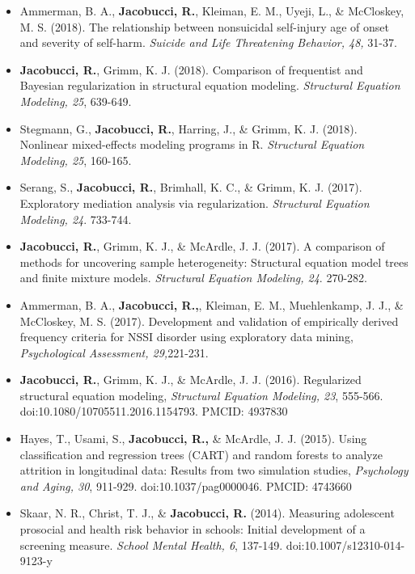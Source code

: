 \documentclass[letterpaper,10pt]{article}
\begin{document}
\begin{itemize}
%
\item[]Ammerman, B. A., \textbf{Jacobucci, R.}, Kleiman, E. M., Uyeji, L., \& McCloskey, M. S. (2018). The relationship between nonsuicidal self-injury age of onset and severity of self-harm. \emph{Suicide and Life Threatening Behavior, 48,} 31-37.
%
\item[] \textbf{Jacobucci, R.}, Grimm, K. J. (2018). Comparison of frequentist and Bayesian regularization in structural equation modeling. \emph{Structural Equation Modeling, 25}, 639-649.
%
\item[]Stegmann, G., \textbf{Jacobucci, R.}, Harring, J., \& Grimm, K. J. (2018). Nonlinear mixed-effects modeling programs in R. \emph{Structural Equation Modeling, 25}, 160-165.
%
\item[]Serang, S., \textbf{Jacobucci, R.}, Brimhall, K. C., \& Grimm, K. J. (2017). Exploratory mediation analysis via regularization. \emph{Structural Equation Modeling, 24}. 733-744.
%
\item[]\textbf{Jacobucci, R.}, Grimm, K. J., \& McArdle, J. J. (2017). A comparison of methods for uncovering sample heterogeneity: Structural equation model trees and finite mixture models. \emph{Structural Equation Modeling, 24}. 270-282.
%
\item[]Ammerman, B. A., \textbf{Jacobucci, R.,}, Kleiman, E. M., Muehlenkamp, J. J., \& McCloskey, M. S. (2017). Development and validation of empirically derived frequency criteria for NSSI disorder using exploratory data mining, \emph{Psychological Assessment, 29,}221-231.
%
\item[]\textbf{Jacobucci, R.}, Grimm, K. J., \& McArdle, J. J. (2016). Regularized structural equation modeling, \emph{Structural Equation Modeling, 23}, 555-566. doi:10.1080/10705511.2016.1154793. PMCID: 4937830
%
%
%
\item[]Hayes, T., Usami, S., \textbf{Jacobucci, R.,} \& McArdle, J. J. (2015). Using classification and regression trees (CART) and random forests to analyze attrition in longitudinal data: Results from two simulation studies, \emph{Psychology and Aging, 30}, 911-929. doi:10.1037/pag0000046. PMCID: 4743660
%
\item[]Skaar, N. R., Christ, T. J., \& \textbf{Jacobucci, R.} (2014). Measuring adolescent prosocial and health risk behavior in schools: Initial development of a screening measure. \emph{School Mental Health, 6}, 137-149. doi:10.1007/s12310-014-9123-y

\end{itemize}
\end{document}
